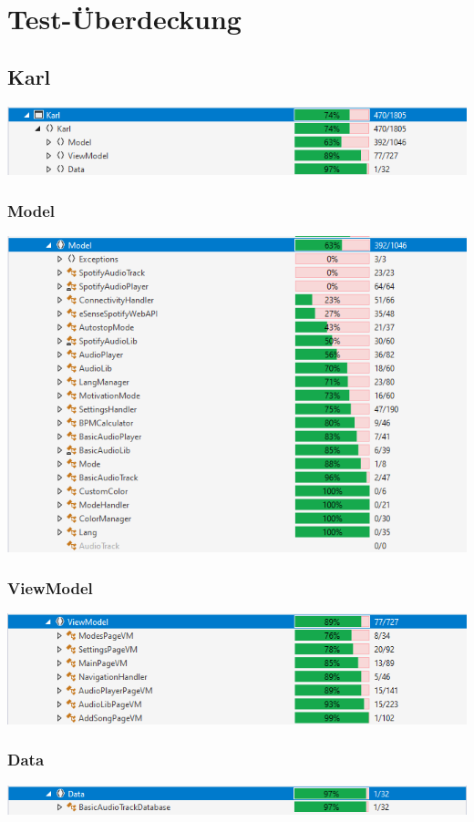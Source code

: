 \documentclass[../validierung.tex]{subfiles}
\begin{document}
\section{Test-Überdeckung}
	\subsection{Karl}
		\includegraphics[width=\textwidth]{karl.png}
			\subsubsection{Model}
				\includegraphics[width=\textwidth]{model.png}
			\subsubsection{ViewModel}
				\includegraphics[width=\textwidth]{vm.png}
			\subsubsection{Data}
				\includegraphics[width=\textwidth]{data.png}
\end{document}
